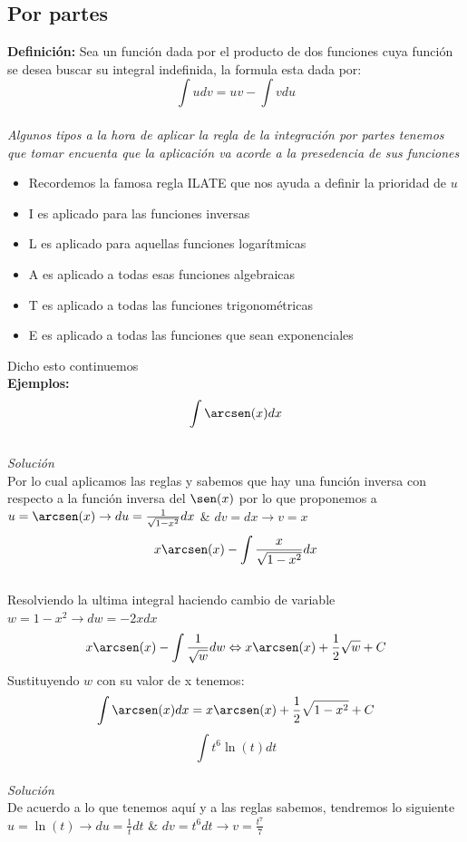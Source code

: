 \documentclass[10pt,executivepaper]{article}
\begin{document}
\subsection{Por partes}
\textbf{Definición:} Sea un función dada por el producto de dos funciones cuya función se desea buscar su integral indefinida, la formula esta dada por:\\
\[\int u dv = uv - \int vdu\]\\
\emph{Algunos tipos a la hora de aplicar la regla de la integración por partes tenemos que tomar encuenta que la aplicación va acorde a la presedencia de sus funciones}
\begin{itemize}
  \item Recordemos la famosa regla ILATE que nos ayuda a definir la prioridad de $u$
  \item I es aplicado para las funciones inversas
  \item L es aplicado para aquellas funciones logarítmicas
  \item A es aplicado a todas esas funciones algebraicas
  \item T es aplicado a todas las funciones trigonométricas
  \item E es aplicado a todas las funciones que sean exponenciales
\end{itemize}
Dicho esto continuemos\\
\textbf{Ejemplos:}\\
\[\int \arcsen(x)dx\]\\
\textit{Solución}\\
Por lo cual aplicamos las reglas y sabemos que hay una función inversa con respecto a la función inversa del $\sen(x)$ por lo que proponemos a $u=\arcsen(x)\rightarrow du = \frac{1}{\sqrt{1-x^{2}}}dx$ \& $dv=dx \rightarrow v=x$
\\
\[x\arcsen(x)-\int \frac{x}{\sqrt{1-x^{2}}}dx\]\\
Resolviendo la ultima integral haciendo cambio de variable $w=1-x^{2} \rightarrow dw=-2x dx$\\
\[x\arcsen(x)-\int \frac{1}{\sqrt{w}}dw \Leftrightarrow x\arcsen(x)+\frac{1}{2}\sqrt{w} + C\]
Sustituyendo $w$ con su valor de x tenemos:
\[\int \arcsen(x)dx=x\arcsen(x)+\frac{1}{2}\sqrt{1-x^{2}}+C\]
\vspace{1cm}
\[\int t^{6}\ln(t)dt\]\\
\textit{Solución}\\
De acuerdo a lo que tenemos aquí y a las reglas sabemos, tendremos lo siguiente $u=\ln(t) \rightarrow du=\frac{1}{t}dt$ \& $dv=t^{6}dt \rightarrow v=\frac{t^7}{7}$\\
\end{document}
